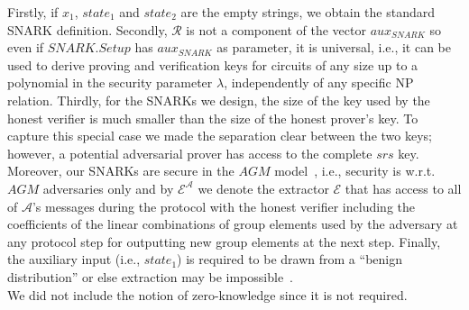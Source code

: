\vspace{-0.04in}
\noindent Firstly, if $x_1$, $\mathit{state_1}$ and $\mathit{state_2}$ are the empty strings, we obtain the standard SNARK definition.
Secondly, $\mathcal{R}$ is not a component of the vector $\mathit{aux_{\mathit{SNARK}}}$ so even if $\mathit{SNARK.Setup}$ has 
$\mathit{aux_{\mathit{SNARK}}}$ as parameter, it is universal, 
i.e., it can be used to derive proving and verification keys for circuits of any size up to a polynomial in the security parameter $\lambda$,   
independently of any specific NP relation. Thirdly, for the SNARKs we design, the size of the key used by the honest verifier is much smaller than the size of the honest prover's key. To capture this special case we made the separation clear between the two keys; however, a potential adversarial prover has access to the complete $\mathit{srs}$ key. 
Moreover, our SNARKs are secure in the $\mathit{AGM}$ model~\cite{AGM_model}, i.e., security is w.r.t. $\mathit{AGM}$ 
adversaries only and by $\mathcal{E}^{\mathcal{A}}$ we denote the 
extractor $\mathcal{E}$ that has access to all of 
$\mathcal{A}$'s messages during the protocol with the honest 
verifier including the coefficients of the linear combinations of 
group elements used by the adversary at any protocol step for outputting new group elements at the next step. Finally, the auxiliary input (i.e., $\mathit{state_1}$) is required to 
be drawn from a ``benign distribution'' or else extraction may be 
impossible~\cite{extractability_limits_1,extractability_limits_2}. \\

\noindent We did not include the notion of zero-knowledge since it is not required.
\vspace{-0.1in}
